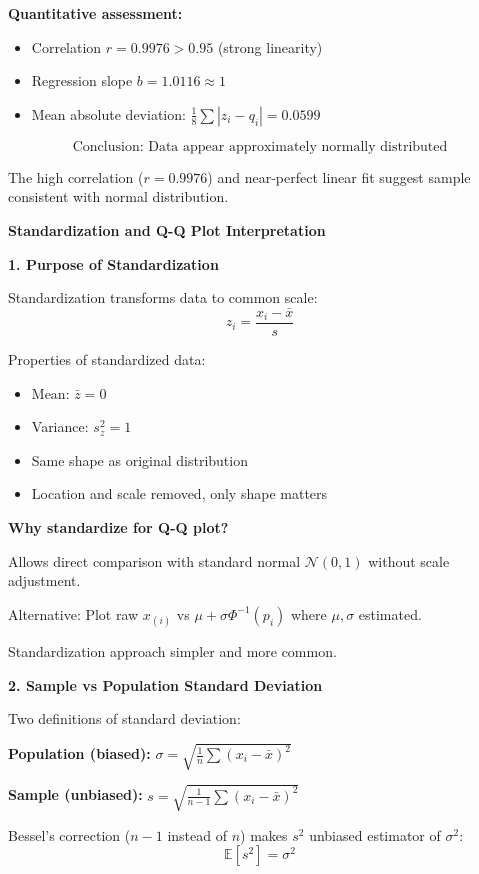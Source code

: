 \documentclass[12pt]{article}
\begin{document}
\begin{solution}
\textbf{Quantitative assessment:}
\begin{itemize}
\item Correlation $r = 0.9976 > 0.95$ (strong linearity)
\item Regression slope $b = 1.0116 \approx 1$
\item Mean absolute deviation: $\frac{1}{8}\sum |z_i - q_i| = 0.0599$
\end{itemize}

\[\boxed{\text{Conclusion: Data appear approximately normally distributed}}\]

The high correlation ($r = 0.9976$) and near-perfect linear fit suggest sample consistent with normal distribution.

\end{solution}

\begin{explanation}

\textbf{Standardization and Q-Q Plot Interpretation}

\textbf{1. Purpose of Standardization}

Standardization transforms data to common scale:
\[z_i = \frac{x_i - \bar{x}}{s}\]

Properties of standardized data:
\begin{itemize}
\item Mean: $\bar{z} = 0$
\item Variance: $s_z^2 = 1$
\item Same shape as original distribution
\item Location and scale removed, only shape matters
\end{itemize}

\textbf{Why standardize for Q-Q plot?}

Allows direct comparison with standard normal $\mathcal{N}(0,1)$ without scale adjustment.

Alternative: Plot raw $x_{(i)}$ vs $\mu + \sigma \Phi^{-1}(p_i)$ where $\mu, \sigma$ estimated.

Standardization approach simpler and more common.

\textbf{2. Sample vs Population Standard Deviation}

Two definitions of standard deviation:

\textbf{Population (biased):} $\sigma = \sqrt{\frac{1}{n}\sum (x_i - \bar{x})^2}$

\textbf{Sample (unbiased):} $s = \sqrt{\frac{1}{n-1}\sum (x_i - \bar{x})^2}$

Bessel's correction ($n-1$ instead of $n$) makes $s^2$ unbiased estimator of $\sigma^2$:
\[\mathbb{E}[s^2] = \sigma^2\]


\end{explanation}
\end{document}
